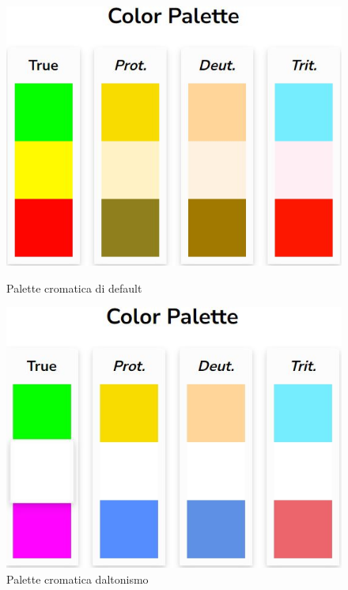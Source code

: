 \documentclass[binding=0.6cm]{sapthesis}
\begin{document}
\begin{figure}[h]
    \centering
    \begin{minipage}{0.48\textwidth}
      \includegraphics[width=\linewidth]{immagini/palette_cromatica.JPG}
      \caption{Palette cromatica di default}
      \label{fig:palette_cromatica}
    \end{minipage}\hfill
    \begin{minipage}{0.48\textwidth}
      \includegraphics[width=\linewidth]{immagini/colorblind_palette.JPG}
      \caption{Palette cromatica daltonismo}
      \label{fig:colorblind_palette}
    \end{minipage}
\end{figure}
\end{document}
